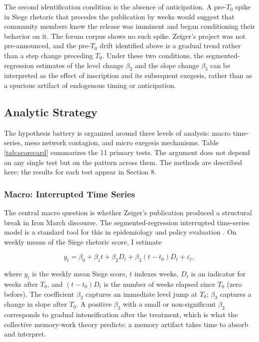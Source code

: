 \documentclass[bibtex,autowc,nonblind]{apsr_submission}
\begin{document}
The second identification condition is the absence of anticipation. A pre-$T_0$ spike in Siege rhetoric that precedes the publication by weeks would suggest that community members knew the release was imminent and began conditioning their behavior on it. The forum corpus shows no such spike. Zeiger's project was not pre-announced, and the pre-$T_0$ drift identified above is a gradual trend rather than a step change preceding $T_0$. Under these two conditions, the segmented-regression estimates of the level change $\beta_2$ and the slope change $\beta_3$ can be interpreted as the effect of inscription and its subsequent exegesis, rather than as a spurious artifact of endogenous timing or anticipation.

\subsection{Analytic Strategy}

The hypothesis battery is organized around three levels of analysis: macro time-series, meso network contagion, and micro exegesis mechanisms. Table \ref{tab:scorecard} summarizes the 11 primary tests. The argument does not depend on any single test but on the pattern across them. The methods are described here; the results for each test appear in Section 8.

\subsubsection{Macro: Interrupted Time Series}

The central macro question is whether Zeiger's publication produced a structural break in Iron March discourse. The segmented-regression interrupted time-series model is a standard tool for this in epidemiology and policy evaluation \citep{wagner2002segmented, bernal2017interrupted}. On weekly means of the Siege rhetoric score, I estimate

\[
y_t = \beta_0 + \beta_1 t + \beta_2 D_t + \beta_3 (t - t_0) D_t + \varepsilon_t,
\]

where $y_t$ is the weekly mean Siege score, $t$ indexes weeks, $D_t$ is an indicator for weeks after $T_0$, and $(t - t_0) D_t$ is the number of weeks elapsed since $T_0$ (zero before). The coefficient $\beta_2$ captures an immediate level jump at $T_0$; $\beta_3$ captures a change in slope after $T_0$. A positive $\beta_3$ with a small or non-significant $\beta_2$ corresponds to gradual intensification after the treatment, which is what the collective memory-work theory predicts: a memory artifact takes time to absorb and interpret.
\end{document}
